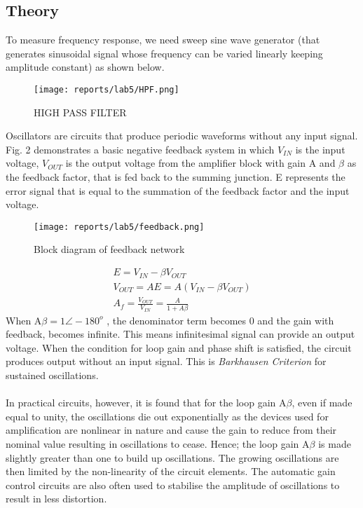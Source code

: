 \documentclass[12pt]{article}
\begin{document}
    \subsection{Theory}
        To measure frequency response, we need sweep sine wave generator (that
        generates sinusoidal signal whose frequency can be varied linearly keeping
        amplitude constant) as shown below.
        \begin{figure}[H]
            \centering
            \texttt{[image: reports/lab5/HPF.png]}
            \caption{HIGH PASS FILTER}
        \end{figure}
        \newpage
        \noindent
        Oscillators are circuits that produce periodic waveforms without any input signal.
        Fig. 2 demonstrates a basic negative feedback system in which $V_{IN}$ is the input voltage, $V_{OUT}$ is the output voltage from the amplifier block with gain A and $\beta$ as the feedback factor, that is fed back to the summing junction. E represents the error signal that is equal to the summation of the feedback factor and the input voltage.
        \begin{figure}[H]
            \centering
            \texttt{[image: reports/lab5/feedback.png]}
            \caption{Block diagram of feedback network}
            \label{fig:loadcell}
        \end{figure}
        \begin{gather}
        	E = V_{IN} - \beta V_{OUT}\\
        	V_{OUT} = AE = A (V_{IN} - \beta V_{OUT})\\
        	A_f = \frac{V_{OUT}}{V_{IN}} = \frac{A}{1 + A\beta}
        \end{gather}
        \noindent
        When A$\beta = 1\angle - 180^o$ , the denominator term becomes 0 and the gain with feedback, becomes infinite. This means infinitesimal signal can provide an output voltage. When the condition for loop gain and phase shift is satisfied, the circuit produces output without an input signal. This is \textit{Barkhausen Criterion} for sustained oscillations.
        \\\\
        In practical circuits, however, it is found that for the loop gain A$\beta$, even if made equal to unity, the oscillations die out exponentially as the devices used for amplification are nonlinear in nature and cause the gain to reduce from their nominal value resulting in oscillations to cease. Hence; the loop gain A$\beta$ is made slightly greater than one to build up oscillations. The growing oscillations are then limited by the non-linearity of the circuit elements. The automatic gain control circuits are also often used to stabilise the amplitude of oscillations to result in less distortion.
\end{document}
